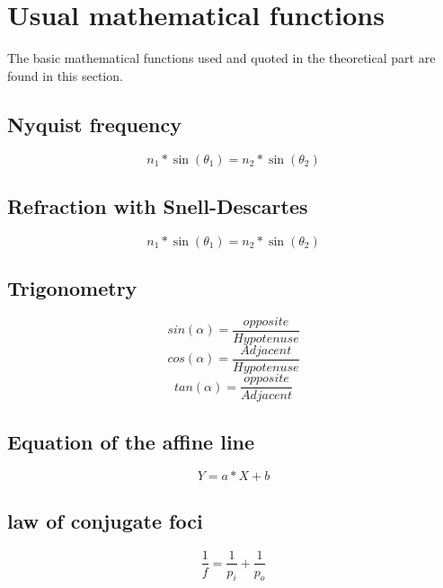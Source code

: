\section{Usual mathematical functions}
The basic mathematical functions used and quoted in the theoretical part are found in this section.
\subsection{Nyquist frequency}
\begin{equation}\label{eq:Nyquist}
      n_1*\sin(\theta_1)=n_2*\sin(\theta_2)
\end{equation}
\subsection{Refraction with Snell-Descartes}
\begin{equation}\label{eq:Snell}
      n_1*\sin(\theta_1)=n_2*\sin(\theta_2)
\end{equation}
\subsection{Trigonometry}
\begin{equation}\label{eq:Trigo_sin}
      sin(\alpha) = \frac{opposite}{Hypotenuse}
\end{equation}
\begin{equation}\label{eq:Trigo_cos}
      cos(\alpha) = \frac{Adjacent}{Hypotenuse}
\end{equation}
\begin{equation}\label{eq:Trigo_tan}
      tan(\alpha) = \frac{opposite}{Adjacent}
\end{equation}
\subsection{Equation of the affine line}
\begin{equation}\label{eq:DoiteAffine}
      Y = a*X+b
\end{equation}
\subsection{law of conjugate foci}
\begin{equation}\label{eq:Conjugate}
      \frac{1}{f}=\frac{1}{p_i}+\frac{1}{p_o}
\end{equation}

